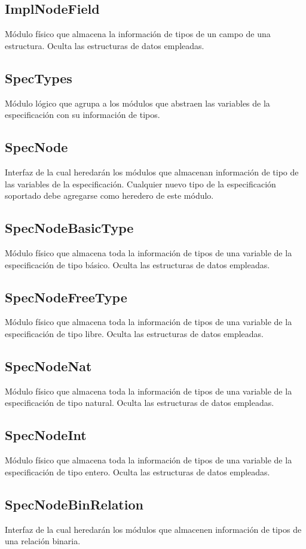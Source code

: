 \documentclass[a4paper,10pt]{report}
\begin{document}
				\subsection{ImplNodeField}
				Módulo físico que almacena la información de tipos de un campo de una estructura. Oculta las estructuras de datos empleadas.
			\subsection{SpecTypes}
			Módulo lógico que agrupa a los módulos que abstraen las variables de la especificación con su información de tipos.
				\subsection{SpecNode}
				Interfaz de la cual heredarán los módulos que almacenan información de tipo de las variables de la especificación. Cualquier nuevo tipo de la especificación soportado debe agregarse como heredero de este módulo.
				\subsection{SpecNodeBasicType}
				Módulo físico que almacena toda la información de tipos de una variable de la especificación de tipo básico. Oculta las estructuras de datos empleadas.
				\subsection{SpecNodeFreeType}
				Módulo físico que almacena toda la información de tipos de una variable de la especificación de tipo libre. Oculta las estructuras de datos empleadas.
				\subsection{SpecNodeNat}
				Módulo físico que almacena toda la información de tipos de una variable de la especificación de tipo natural. Oculta las estructuras de datos empleadas.
				\subsection{SpecNodeInt}
				Módulo físico que almacena toda la información de tipos de una variable de la especificación de tipo entero. Oculta las estructuras de datos empleadas.
				\subsection{SpecNodeBinRelation}
				Interfaz de la cual heredarán los módulos que almacenen información de tipos de una relación binaria.
\end{document}
